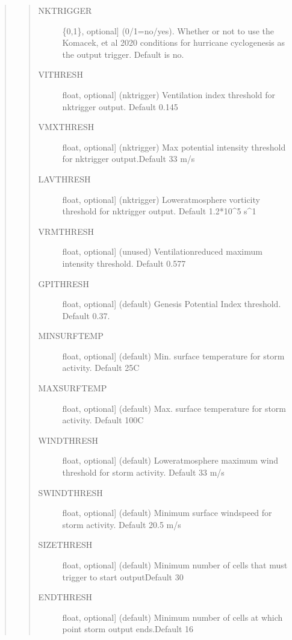 \documentclass[letterpaper,10pt,english]{sphinxmanual}
\begin{document}
\begin{fulllineitems}
\begin{fulllineitems}
\begin{quote}
\begin{quote}
\begin{description}
\begin{description}
\begin{description}
\item[{NKTRIGGER}] \leavevmode{[}\{0,1\}, optional{]}
(0/1=no/yes). Whether or not to use the Komacek, et al 2020 conditions for hurricane cyclogenesis as the output trigger. Default is no.

\item[{VITHRESH}] \leavevmode{[}float, optional{]}
(nktrigger) Ventilation index threshold for nktrigger output. Default 0.145

\item[{VMXTHRESH}] \leavevmode{[}float, optional{]}
(nktrigger) Max potential intensity threshold for nktrigger output.Default 33 m/s

\item[{LAVTHRESH}] \leavevmode{[}float, optional{]}
(nktrigger) Lower\sphinxhyphen{}atmosphere vorticity threshold for nktrigger output. Default 1.2*10\textasciicircum{}\sphinxhyphen{}5 s\textasciicircum{}\sphinxhyphen{}1

\item[{VRMTHRESH}] \leavevmode{[}float, optional{]}
(unused) Ventilation\sphinxhyphen{}reduced maximum intensity threshold. Default 0.577

\item[{GPITHRESH}] \leavevmode{[}float, optional{]}
(default) Genesis Potential Index threshold. Default 0.37.

\item[{MINSURFTEMP}] \leavevmode{[}float, optional{]}
(default) Min. surface temperature for storm activity. Default 25C

\item[{MAXSURFTEMP}] \leavevmode{[}float, optional{]}
(default) Max. surface temperature for storm activity. Default 100C

\item[{WINDTHRESH}] \leavevmode{[}float, optional{]}
(default) Lower\sphinxhyphen{}atmosphere maximum wind threshold for storm activity.  Default 33 m/s

\item[{SWINDTHRESH}] \leavevmode{[}float, optional{]}
(default) Minimum surface windspeed for storm activity. Default 20.5 m/s

\item[{SIZETHRESH}] \leavevmode{[}float, optional{]}
(default) Minimum number of cells that must trigger to start outputDefault 30

\item[{ENDTHRESH}] \leavevmode{[}float, optional{]}
(default) Minimum number of cells at which point storm output ends.Default 16


\end{description}
\end{description}
\end{description}
\end{quote}
\end{quote}
\end{fulllineitems}
\end{fulllineitems}
\end{document}
